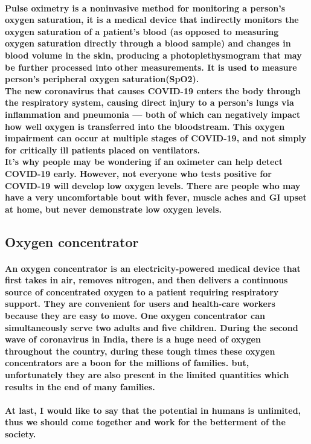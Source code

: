 \documentclass{article}
\begin{document}
	\paragraph{Pulse oximetry is a noninvasive method for monitoring a person's oxygen saturation, it is a medical device that indirectly monitors the oxygen saturation of a patient's blood (as opposed to measuring oxygen saturation directly through a blood sample) and changes in blood volume in the skin, producing a photoplethysmogram that may be further processed into other measurements. It is used to measure person's peripheral oxygen saturation(SpO2).\\
	The new coronavirus that causes COVID-19 enters the body through the respiratory system, causing direct injury to a person's lungs via inflammation and pneumonia — both of which can negatively impact how well oxygen is transferred into the bloodstream. This oxygen impairment can occur at multiple stages of COVID-19, and not simply for critically ill patients placed on ventilators.\\
	It's why people may be wondering if an oximeter can help detect COVID-19 early. However, not everyone who tests positive for COVID-19 will develop low oxygen levels. There are people who may have a very uncomfortable bout with fever, muscle aches and GI upset at home, but never demonstrate low oxygen levels.}
	\subsection{\textbf{Oxygen concentrator}}
	\paragraph{An oxygen concentrator is an electricity-powered medical device that first takes in air, removes nitrogen, and then delivers a continuous source of concentrated oxygen to a patient requiring respiratory support. They are convenient for users and health-care workers because they are easy to move. One oxygen concentrator can simultaneously serve two adults and five children. During the second wave of coronavirus in India, there is a huge need of oxygen throughout the country, during these tough times these oxygen concentrators are a boon for the millions of families. but, unfortunately they are also present in the limited quantities which results in the end of many families.\\\\
	At last, I would like to say that the potential in humans is unlimited, thus we should come together and work for the betterment of the society.}
\end{document}
